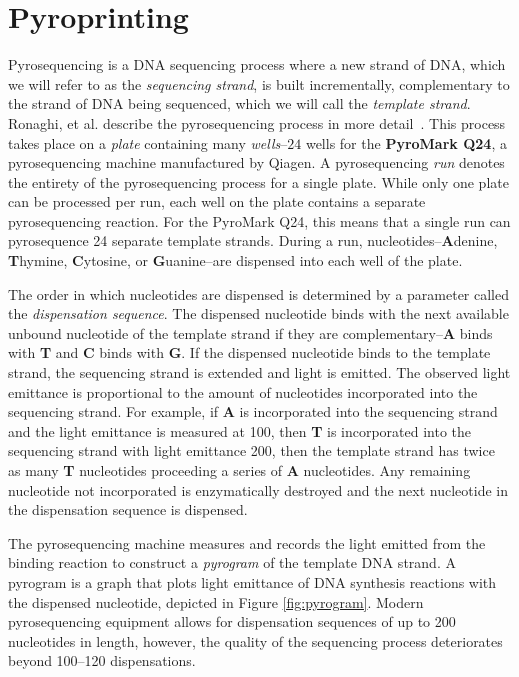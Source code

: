 \documentclass[12pt]{ucthesis}
\begin{document}
   \section{Pyroprinting}\label{sec:pyroprinting}
      Pyrosequencing is a DNA sequencing process where a new strand of DNA,
      which we will refer to as the \textit{sequencing strand}, is built
      incrementally, complementary to the strand of DNA being sequenced, which
      we will call the \textit{template strand}. Ronaghi, et al. describe the
      pyrosequencing process in more detail~\cite{ronaghi:shedsLight}. This
      process takes place on a \textit{plate} containing many
      \textit{wells}--$24$ wells for the \textbf{PyroMark Q24}, a
      pyrosequencing machine manufactured by Qiagen. A pyrosequencing
      \textit{run} denotes the entirety of the pyrosequencing process for a
      single plate. While only one plate can be processed per run, each well on
      the plate contains a separate pyrosequencing reaction. For the PyroMark
      Q24, this means that a single run can pyrosequence 24 separate template
      strands. During a run, nucleotides--\textbf{A}denine, \textbf{T}hymine,
      \textbf{C}ytosine, or \textbf{G}uanine--are dispensed into each well of
      the plate.
      
      The order in which nucleotides are dispensed is determined by
      a parameter called the \textit{dispensation sequence}. The dispensed
      nucleotide binds with the next available unbound nucleotide of the
      template strand if they are complementary--\textbf{A} binds with
      \textbf{T} and \textbf{C} binds with \textbf{G}. If the dispensed
      nucleotide binds to the template strand, the sequencing strand is
      extended and light is emitted. The observed light emittance is
      proportional to the amount of nucleotides incorporated into the
      sequencing strand. For example, if \textbf{A} is incorporated into the
      sequencing strand and the light emittance is measured at 100, then
      \textbf{T} is incorporated into the sequencing strand with light
      emittance 200, then the template strand has twice as many \textbf{T}
      nucleotides proceeding a series of \textbf{A} nucleotides. Any remaining
      nucleotide not incorporated is enzymatically destroyed and the next
      nucleotide in the dispensation sequence is dispensed.
      
      The pyrosequencing machine measures and records the light emitted from
      the binding reaction to construct a \textit{pyrogram} of the template DNA
      strand. A pyrogram is a graph that plots light emittance of DNA synthesis
      reactions with the dispensed nucleotide, depicted in Figure
      \ref{fig:pyrogram}. Modern pyrosequencing equipment allows for
      dispensation sequences of up to 200 nucleotides in length, however, the
      quality of the sequencing process deteriorates beyond 100--120
      dispensations.
\end{document}
